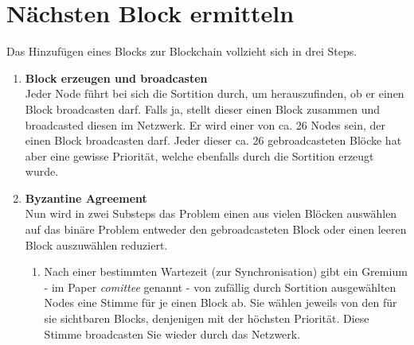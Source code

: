 \documentclass[11pt,a4paper]{article}
\begin{document}
\newpage
\section*{N\"achsten Block ermitteln}
Das Hinzuf\"ugen eines Blocks zur Blockchain vollzieht sich in drei Steps. %
\begin{enumerate}[label=\arabic*)]
	\item \textbf{Block erzeugen und broadcasten}\\
	Jeder Node f\"uhrt bei sich die Sortition durch, um herauszufinden, ob er einen Block broadcasten darf.
Falls ja, stellt dieser einen Block zusammen und \grqq{}broadcasted\grqq{} diesen im Netzwerk.
Er wird einer von ca. 26 Nodes sein, der einen Block broadcasten darf.
Jeder dieser ca. 26 gebroadcasteten Bl\"ocke hat aber eine gewisse Priorit\"at, welche ebenfalls durch die Sortition erzeugt wurde.
	 
	\item \textbf{Byzantine Agreement}\\
	Nun wird in zwei Substeps das Problem \grqq{}einen aus vielen Bl\"ocken ausw\"ahlen\grqq{} auf das bin\"are Problem \grqq{}entweder den gebroadcasteten Block oder einen leeren Block auszuw\"ahlen\grqq{} reduziert.
	\begin{enumerate}[label=\Roman*)]
		\item Nach einer bestimmten Wartezeit (zur Synchronisation) gibt ein Gremium - im Paper \textit{comittee} genannt - von zuf\"allig durch Sortition ausgew\"ahlten Nodes eine Stimme f\"ur je einen Block ab. Sie w\"ahlen jeweils von den f\"ur sie sichtbaren Blocks, denjenigen mit der h\"ochsten Priorit\"at.
		Diese Stimme broadcasten Sie wieder durch das Netzwerk.
		

\end{enumerate}
\end{enumerate}
\end{document}
